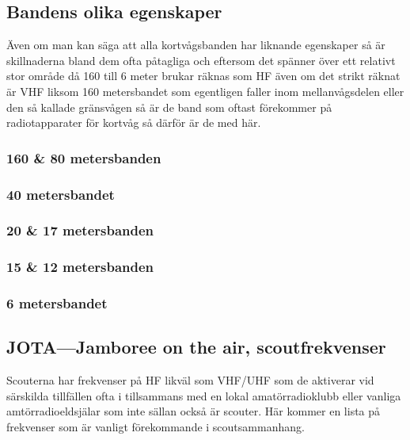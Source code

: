 
\subsection{Bandens olika egenskaper}

Även om man kan säga att alla kortvågsbanden har liknande egenskaper så är
skillnaderna bland dem ofta påtagliga och eftersom det spänner över ett relativt
stor område då 160 till 6 meter brukar räknas som HF även om det strikt räknat
är VHF liksom 160 metersbandet som egentligen faller inom mellanvågsdelen eller
den så kallade gränsvågen så är de band som oftast förekommer på radiotapparater
för kortvåg så därför är de med här.

\subsubsection{160 \& 80 metersbanden}

\subsubsection{40 metersbandet}

\subsubsection{20 \& 17 metersbanden}

\subsubsection{15 \& 12 metersbanden}

\subsubsection{6 metersbandet}

\subsection{JOTA---Jamboree on the air, scoutfrekvenser}

Scouterna har frekvenser på HF likväl som VHF/UHF som de aktiverar vid särskilda
tillfällen ofta i tillsammans med en lokal amatörradioklubb eller vanliga
amtörradioeldsjälar som inte sällan också är scouter. Här kommer en lista på
frekvenser som är vanligt förekommande i scoutsammanhang.

